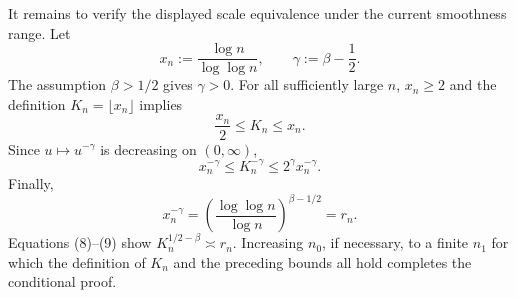 It remains to verify the displayed scale equivalence under the current smoothness range.  Let
\[
x_n:=\frac{\log n}{\log\log n},
\qquad
\gamma:=\beta-\frac12.
\]
The assumption \(\beta>1/2\) gives \(\gamma>0\).  For all sufficiently large \(n\), \(x_n\ge2\) and the definition \(K_n=\lfloor x_n\rfloor\) implies
\[
\frac{x_n}{2}\le K_n\le x_n.
\]
Since \(u\mapsto u^{-\gamma}\) is decreasing on \((0,\infty)\),
\[
x_n^{-\gamma}\le K_n^{-\gamma}\le 2^\gamma x_n^{-\gamma}.
\tag{8}
\]
Finally,
\[
x_n^{-\gamma}
=\left(\frac{\log\log n}{\log n}\right)^{\beta-1/2}
=r_n.
\tag{9}
\]
Equations (8)--(9) show \(K_n^{1/2-\beta}\asymp r_n\).  Increasing \(n_0\), if necessary, to a finite \(n_1\) for which the definition of \(K_n\) and the preceding bounds all hold completes the conditional proof.
